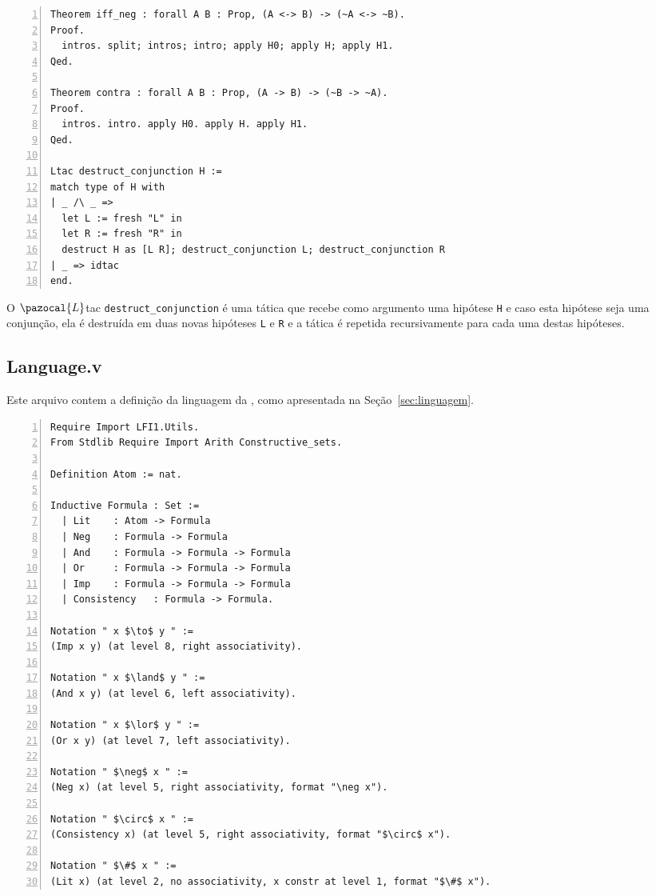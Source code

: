       \begin{lstlisting}[name=Utils, numbers=left, frame=single, language=coq]
Theorem iff_neg : forall A B : Prop, (A <-> B) -> (~A <-> ~B).
Proof.
  intros. split; intros; intro; apply H0; apply H; apply H1.
Qed.

Theorem contra : forall A B : Prop, (A -> B) -> (~B -> ~A).
Proof.
  intros. intro. apply H0. apply H. apply H1.
Qed. 

Ltac destruct_conjunction H :=
match type of H with
| _ /\ _ => 
  let L := fresh "L" in
  let R := fresh "R" in
  destruct H as [L R]; destruct_conjunction L; destruct_conjunction R
| _ => idtac
end.
      \end{lstlisting}

      O $\pazocal{L}$tac  \texttt{destruct\_conjunction} é uma tática que recebe como argumento uma hipótese \texttt{H} e caso esta hipótese seja uma conjunção, ela é destruída em duas novas hipóteses \texttt{L} e \texttt{R} e a tática é repetida recursivamente para cada uma destas hipóteses.

      \subsection{Language.v}\label{sec:language}

      Este arquivo contem a definição da linguagem da \lfium{}, como apresentada na Seção~\ref{sec:linguagem}.

      \begin{lstlisting}[name=Language, numbers=left, frame=single, language=coq]
Require Import LFI1.Utils.
From Stdlib Require Import Arith Constructive_sets.

Definition Atom := nat.

Inductive Formula : Set :=
  | Lit    : Atom -> Formula
  | Neg    : Formula -> Formula
  | And    : Formula -> Formula -> Formula
  | Or     : Formula -> Formula -> Formula
  | Imp    : Formula -> Formula -> Formula
  | Consistency   : Formula -> Formula.

Notation " x $\to$ y " := 
(Imp x y) (at level 8, right associativity).

Notation " x $\land$ y " := 
(And x y) (at level 6, left associativity).

Notation " x $\lor$ y " := 
(Or x y) (at level 7, left associativity).

Notation " $\neg$ x " := 
(Neg x) (at level 5, right associativity, format "\neg x").

Notation " $\circ$ x " := 
(Consistency x) (at level 5, right associativity, format "$\circ$ x").

Notation " $\#$ x " :=
(Lit x) (at level 2, no associativity, x constr at level 1, format "$\#$ x").
      \end{lstlisting}
      
